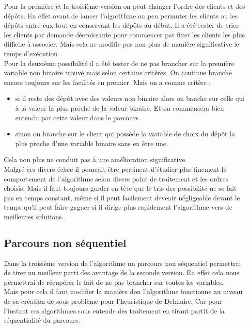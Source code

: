 \documentclass[12pt,a4paper]{article}
\begin{document}
Pour la première et la troisième version on peut changer l'ordre des clients et des dépôts. En effet avant de lancer l'algorithme on peu permuter les clients ou les dépôts entre eux tout en conservant les dépôts au début. Il a été tester de trier les clients par demande décroissante pour commencer par fixer les clients les plus difficile à associer. Mais cela ne modifie pas non plus de manière significative le temps d’exécution.\\

Pour la deuxième possibilité il a été tester de ne pas brancher sur la première variable non binaire trouvé mais selon certains critères. On continue branche encore toujours sur les facilités en premier. Mais on a comme critère :
\begin{itemize}
\item
si il reste des dépôt avec des valeurs non binaire alors on banche sur celle qui à la valeur la plus proche de la valeur binaire. Et on commencera bien entendu par cette valeur dans le parcours.
\item
sinon on branche sur le client qui possède la variable de choix du dépôt la plus proche d'une variable binaire sans en être une.
\end{itemize}
Cela non plus ne conduit pas à une amélioration significative.\\

Malgré ces divers échec il pourrait être pertinent d’étudier plus finement le comportement de l'algorithme selon divers point de traitement et les ordres choisis. Mais il faut toujours garder en tète que le tris des possibilité ne se fait pas en temps constant, même si il peut facilement devenir négligeable devant le temps qu'il peut faire gagner si il dirige plus rapidement l'algorithme vers de meilleures solutions.

\subsection{Parcours non séquentiel}

Dans la troisième version de l'algorithme un parcours non séquentiel permettrai de tirer un meilleur parti des avantage de la seconde version. En effet cela nous permettrai de récupérer le fait de ne pas brancher sur toutes les variables.\\

Mais pour cela il faut modifier la manière don l'algorithme fonctionne au niveau de sa création de sous problème pour l'heuristique de Delmaire. Car pour l'instant ces algorithmes sous entende des traitement en tirant partit de la séquentialité du parcours.\\
\end{document}
